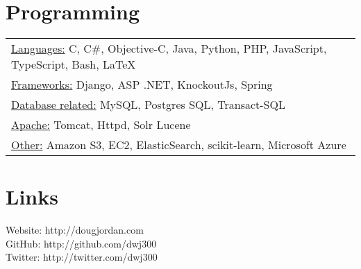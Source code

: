 \documentclass[margin]{res}
\begin{document}
\begin{resume}
\section{Programming}
\begin{tabular}{l} 
\underline{Languages:} C, C\#, Objective-C, Java, Python, PHP, JavaScript, TypeScript, Bash, LaTeX \\
\underline{Frameworks:} Django, ASP .NET, KnockoutJs, Spring \\
\underline{Database related:} MySQL, Postgres SQL, Transact-SQL \\
\underline{Apache:} Tomcat, Httpd, Solr Lucene \\
\underline{Other:} Amazon S3, EC2, ElasticSearch, scikit-learn, Microsoft Azure
\end{tabular}

\section{Links}
Website: http://dougjordan.com \\
GitHub: http://github.com/dwj300 \\
Twitter: http://twitter.com/dwj300 \\
\end{resume}
\end{document}
